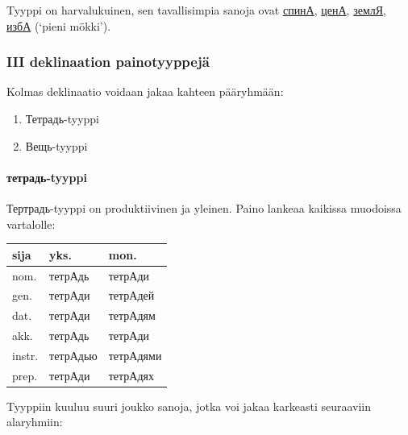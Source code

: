\documentclass[]{scrartcl}
\providecommand{\tightlist}{%
  \setlength{\itemsep}{0pt}\setlength{\parskip}{0pt}}
\begin{document}
Tyyppi on harvalukuinen, sen tavallisimpia sanoja ovat
\href{http://ru.wiktionary.org/wiki/\%D1\%81\%D0\%BF\%D0\%B8\%D0\%BD\%D0\%B0}{спинА},
\href{http://ru.wiktionary.org/wiki/\%D1\%86\%D0\%B5\%D0\%BD\%D0\%B0}{ценА},
\href{http://ru.wiktionary.org/wiki/\%D0\%B7\%D0\%B5\%D0\%BC\%D0\%BB\%D1\%8F}{землЯ},
\href{http://ru.wiktionary.org/wiki/\%D0\%B8\%D0\%B7\%D0\%B1\%D0\%B0}{избА}
(`pieni mökki').

\subsubsection{III deklinaation
painotyyppejä}\label{iii-deklinaation-painotyyppejuxe4}

Kolmas deklinaatio voidaan jakaa kahteen pääryhmään:

\begin{enumerate}
\def\labelenumi{\arabic{enumi}.}
\tightlist
\item
  Тетрадь-tyyppi
\item
  Вещь-tyyppi
\end{enumerate}

\paragraph{тетрадь-tyyppi}\label{ux442ux435ux442ux440ux430ux434ux44c-tyyppi}

Тертрадь-tyyppi on produktiivinen ja yleinen. Paino lankeaa kaikissa
muodoissa vartalolle:

\begin{longtable}[c]{@{}lll@{}}
\toprule
sija & yks. & mon.\tabularnewline
\midrule
\endhead
nom. & тетрАдь & тетрАди\tabularnewline
gen. & тетрАди & тетрАдей\tabularnewline
dat. & тетрАди & тетрАдям\tabularnewline
akk. & тетрАдь & тетрАди\tabularnewline
instr. & тетрАдью & тетрАдями\tabularnewline
prep. & тетрАди & тетрАдях\tabularnewline
\bottomrule
\end{longtable}

Tyyppiin kuuluu suuri joukko sanoja, jotka voi jakaa karkeasti
seuraaviin alaryhmiin:
\end{document}

